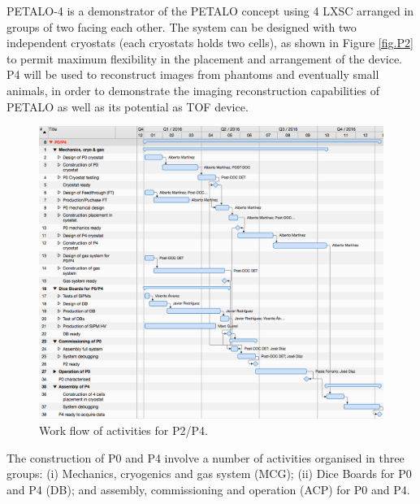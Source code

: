 PETALO-4 is a demonstrator of the PETALO concept using 4 LXSC arranged in groups of two facing each other. The system can be designed with two independent cryostats (each cryostats holds two cells), as shown in Figure \ref{fig.P2} to permit maximum flexibility in the placement and arrangement of the device. P4 will be used to reconstruct images from phantoms and eventually small animals, in order to demonstrate the imaging reconstruction capabilities of PETALO as well as its potential as TOF device. 


\begin{figure}[!htb]
	\centering
	\includegraphics[scale=0.5]{img/P4WF.png}
	\caption{\label{fig.P2WF} Work flow of activities for P2/P4.  }
\end{figure}

The construction of P0 and P4 involve a number of activities  organised in three groups: (i) Mechanics, cryogenics and gas system (MCG);  (ii) Dice Boards for P0 and P4 (DB);  and assembly, commissioning and operation (ACP) for P0 and P4. 

